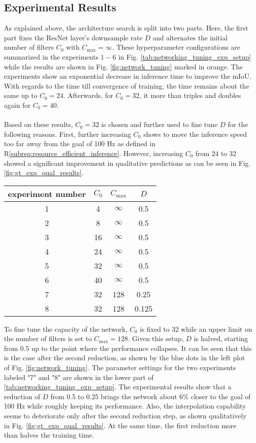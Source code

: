 \subsection{Experimental Results}
\label{subsec:exp_results_unet_arch}
As explained above, the architecture search is split into two parts. Here, the first part fixes the ResNet layer's downsample rate $D$ and alternates the initial number of filters $C_0$ with $C_{\max} = \infty$. These hyperparameter configurations are summarized in the experiments $1-6$ in Fig. \ref{tab:networking_tuning_exp_setup} while the results are shown in Fig. \ref{fig:network_tuning} marked in orange. The experiments show an exponential decrease in inference time to improve the mIoU. With regards to the time till convergence of training, the time remains about the same up to $C_0 = 24$. Afterwards, for $C_0 = 32$, it more than triples and doubles again for $C_0 = 40$.
\\\\
Based on these results, $C_0 = 32$ is chosen and further used to fine tune $D$ for the following reasons. First, further increasing $C_0$ shows to move the inference speed too far away from the goal of 100 Hz as defined in R\ref{subreq:resource_efficient_inference}. However, increasing $C_0$ from $24$ to $32$ showed a significant improvement in qualitative predictions as can be seen in Fig. \ref{fig:gt_exp_qual_results}.
\begin{center}
\begin{tabular}{c|c|c|c}
	experiment number & $C_0$ & $C_{\max}$ & $D$ \\
	\hline
	1 & 4 & $\infty$ & 0.5 \\
	2 & 8 & $\infty$ & 0.5 \\
	3 & 16 & $\infty$ & 0.5 \\
	4 & 24 & $\infty$ & 0.5 \\
	5 & 32 & $\infty$ & 0.5 \\
	6 & 40 & $\infty$ & 0.5 \\
	\hline
	7 & 32 & 128 & 0.25 \\
	8 & 32 & 128 & 0.125
\end{tabular}
\end{center}
To fine tune the capacity of the network, $C_0$ is fixed to 32 while an upper limit on the number of filters is set to $C_{\max}=128$. Given this setup, $D$ is halved, starting from 0.5 up to the point where the performance collapses. It can be seen that this is the case after the second reduction, as shown by the blue dots in the left plot of Fig. \ref{fig:network_tuning}. The parameter settings for the two experiments labeled "7" and "8" are shown in the lower part of \ref{tab:networking_tuning_exp_setup}. The experimental results show that a reduction of $D$ from 0.5 to 0.25 brings the network about $6\%$ closer to the goal of 100 Hz while roughly keeping its performance. Also, the interpolation capability seems to deteriorate only after the second reduction step, as shown qualitatively in Fig. \ref{fig:gt_exp_qual_results}. At the same time, the first reduction more than halves the training time.
